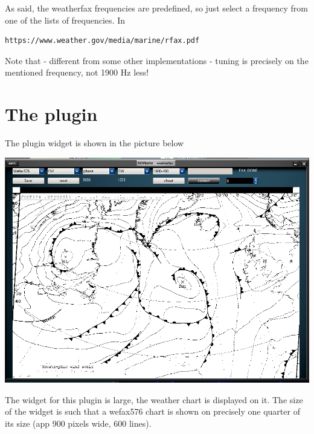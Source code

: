 \documentclass[11pt]{article}
\begin{document}
As said, the weatherfax frequencies are predefined, so just select
a frequency from one of the lists of frequencies.
In 
\begin{verbatim}
https://www.weather.gov/media/marine/rfax.pdf
\end{verbatim}

Note that - different from some other implementations - tuning is
precisely on the mentioned frequency, not 1900 Hz less!
\section{The plugin}
The plugin widget is shown in the picture below

\includegraphics[width=140mm]{wfax-example-2.png}

The widget for this plugin is large, the weather chart is displayed
on it. The size of the widget is such that a wefax576 chart is shown
on precisely one quarter of its size (app 900 pixels wide, 600 lines).
\end{document}
